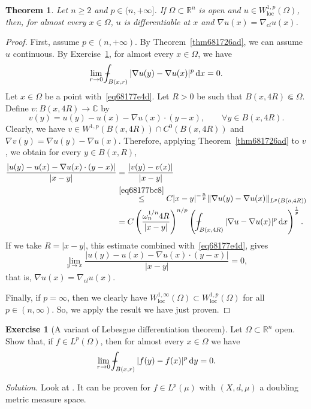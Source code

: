 \documentclass[a4paper,9pt]{amsart}
\newcommand{\R}{\mathbb{R}}	%
\newcommand{\C}{\mathbb{C}}	%
\newcommand{\did}{\,\mathrm{d}}	%
\newcommand{\loc}{\mathrm{loc}}
\newcommand{\grad}{\nabla}
\def\Xint#1{\mathchoice
      {\XXint\displaystyle\textstyle{#1}}%
      {\XXint\textstyle\scriptstyle{#1}}%
      {\XXint\scriptstyle\scriptscriptstyle{#1}}%
      {\XXint\scriptscriptstyle\scriptscriptstyle{#1}}%
      \!\int}
\def\XXint#1#2#3{{\setbox0=\hbox{$#1{#2#3}{\int}$}
        \vcenter{\hbox{$#2#3$}}\kern-.5\wd0}}
\def\fint{\Xint-}
\theoremstyle{plain}
\newtheorem{theorem}[proposition]{Theorem}
\theoremstyle{definition}
\newtheorem{exercise}[proposition]{Exercise}%
\theoremstyle{remark}
\begin{document}
\begin{theorem}\label{thm68357e9c}
	Let $n\ge2$ and $p\in(n,+\infty]$.
	If $\Omega\subset\R^n$ is open and $u\in W^{1,p}_\loc(\Omega)$, 
	then, for almost every $x\in\Omega$, $u$ is differentiable at $x$ and $\grad u(x) = \grad_{cl} u(x)$.
\end{theorem}
\begin{proof}
	First, assume $p\in(n,+\infty)$.
	By Theorem~\ref{thm681726ad}, we can assume $u$ continuous.
	By Exercise~\ref{ex68177e18}, for almost every $x\in\Omega$, we have
	\begin{equation}\label{eq68177e4d}
		\lim_{r\to0} \fint_{B(x,r)} |\grad u(y) - \grad u(x)|^p \did x = 0 .
	\end{equation}
	Let $x\in\Omega$ be a point with~\eqref{eq68177e4d}.
	Let $R>0$ be such that $B(x,4R)\Subset\Omega$.
	Define $v:B(x,4R)\to\C$ by
	\begin{equation}
		v(y) = u(y) - u(x) - \grad u(x) \cdot(y-x) ,
		\qquad\forall y\in B(x,4R) .
	\end{equation}
	Clearly, we have $v\in W^{1,p}(B(x,4R))\cap C^0(B(x,4R))$ and 
	$\grad v(y) = \grad u(y) - \grad u(x)$.
	Therefore, applying Theorem~\ref{thm681726ad} to $v$,
	we obtain for every $y\in B(x,R)$,
	\begin{align}
		\frac{ |u(y) - u(x) - \grad u(x) \cdot(y-x) | }{ |x-y| }
		&= \frac{ |v(y)-v(x)| }{ |x-y| } \\
		&\overset{\eqref{eq68177bc8}}\le C |x-y|^{-\frac{n}{p}} \|\grad u(y) - \grad u(x)\|_{L^p(B(o,4R))} \\
		&= C \left( \frac{ \omega_n^{1/n} 4R }{ |x-y| } \right)^{n/p}
			\left( \fint_{B(x,4R)} |\grad u - \grad u(x)|^p \did x \right)^{\frac1p} .
	\end{align}
	If we take $R=|x-y|$, this estimate combined with~\eqref{eq68177e4d}, gives
	\begin{equation}
		\lim_{y\to x} \frac{ |u(y) - u(x) - \grad u(x) \cdot(y-x) | }{ |x-y| } = 0 ,
	\end{equation}
	that is, $\grad u(x) = \grad_{cl}u(x)$.
	
	Finally, if $p=\infty$, then we clearly have $W^{1,\infty}_\loc (\Omega)\subset W^{1,p}_\loc(\Omega)$ for all $p\in(n,\infty)$.
	So, we apply the result we have just proven.
\end{proof}

\begin{exercise}[A variant of Lebesgue differentiation theorem]\label{ex68177e18}
	Let $\Omega\subset\R^n$ open.
	Show that, if $f\in L^p(\Omega)$, then for almost every $x\in\Omega$ we have
	\begin{equation}%
		\lim_{r\to0} \fint_{B(x,r)} |f(y)-f(x)|^p \did y = 0 .
	\end{equation}
	
	{\it Solution.}
	Look at \cite[\S1.5.7\&\S1.1.8]{MR0290095}.
	It can be proven for $f\in L^p(\mu)$ with $(X,d,\mu)$ a doubling metric measure space.
\end{exercise}
\end{document}
